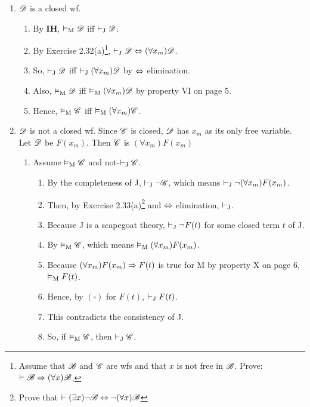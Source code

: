 \begin{enumerate} [label = \textit{Case 4\alph*.}, leftmargin=3\parindent]
    \item $\mathscr{D}$ is a closed wf.
    \begin{enumerate} [label = \roman*.]
        \item By \textbf{IH}, $\vDash_\text{M} \mathscr{D}$ iff $\vdash_\text{J} \mathscr{D}$.
        \item By Exercise 2.32(a)\footnote{Assume that $\mathscr{B}$ and $\mathscr{C}$ are wfs and that $x$ is not free in $\mathscr{B}$. Prove: $\vdash \mathscr{B} \Rightarrow (\forall x) \mathscr{B}$.}, $\vdash_\text{J} \mathscr{D} \Leftrightarrow (\forall x_m) \mathscr{D}$.
        \item So, $\vdash_\text{J} \mathscr{D}$ iff $\vdash_\text{J} (\forall x_m) \mathscr{D}$ by $\Leftrightarrow$ elimination.
        \item Also, $\vDash_\text{M} \mathscr{D}$ iff $\vDash_\text{M} (\forall x_m) \mathscr{D}$ by property VI on page 5.
        \item Hence, $\vDash_\text{M} \mathscr{C}$ iff $\vDash_\text{M} (\forall x_m) \mathscr{C}$.
    \end{enumerate}
    \item $\mathscr{D}$ is not a closed wf. Since $\mathscr{C}$ is closed, $\mathscr{D}$ has $x_m$ as its only free variable. Let $\mathscr{D}$ be $F(x_m)$. Then $\mathscr{C}$ is $(\forall x_m) F(x_m)$
    \begin{enumerate} [label = \roman*.]
        \item Assume $\vDash_\text{M} \mathscr{C}$ and not-$\vdash_\text{J} \mathscr{C}$.
        \begin{enumerate} [label = \alph*.]
            \item By the completeness of J, $\vdash_\text{J} \lnot \mathscr{C}$, which means $\vdash_\text{J} \lnot (\forall x_m) F(x_m)$.
            \item Then, by Exercise 2.33(a)\footnote{Prove that $\vdash (\exists x) \lnot \mathscr{B} \Leftrightarrow \lnot (\forall x) \mathscr{B}$} and $\Leftrightarrow$ elimination, $\vdash_\text{J}$.
            \item Because J is a scapegoat theory, $\vdash_\text{J} \lnot F(t)$ for some closed term $t$ of J.
            \item By $\vDash_\text{M} \mathscr{C}$, which means $\vDash_\text{M} (\forall x_m)F(x_m)$.
            \item Because $(\forall x_m)F(x_m) \Rightarrow F(t)$ is true for M by property X on page 6, $\vDash_\text{M} F(t)$.
            \item Hence, by $\bm{(\square)}$ for $F(t)$, $\vdash_\text{J} F(t)$.
            \item This contradicts the consistency of J.
            \item So, if $\vDash_\text{M} \mathscr{C}$, then $\vdash_\text{J} \mathscr{C}$.
        \end{enumerate}

\end{enumerate}
\end{enumerate}
